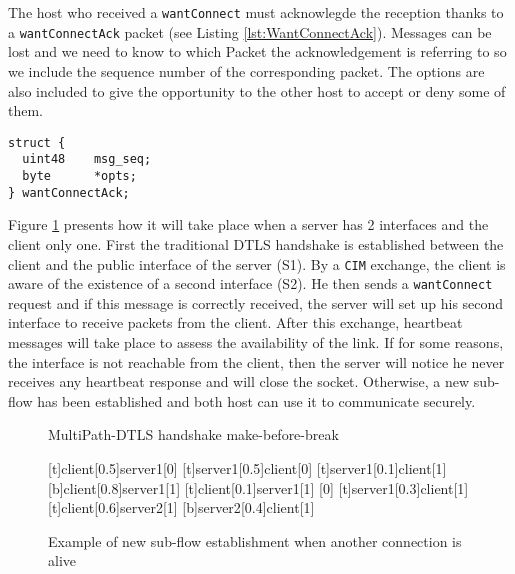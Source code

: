 The host who received a \verb!wantConnect! must acknowlegde the reception thanks to a \verb!wantConnectAck! packet (see Listing \ref{lst:WantConnectAck}). Messages can be lost and we need to know to which Packet the acknowledgement is referring to so we include the sequence number of the corresponding packet. The options are also included to give the opportunity to the other host to accept or deny some of them.

\begin{lstlisting}[caption= wantConnectAck message structure, label=lst:WantConnectAck]
struct {
  uint48    msg_seq;
  byte      *opts;
} wantConnectAck;
\end{lstlisting}

Figure \ref{fig:Handshake1} presents how it will take place when a server has 2 interfaces and the client only one. First the traditional DTLS handshake is established between the client and the public interface of the server (S1). By a \verb!CIM! exchange, the client is aware of the existence of a second interface (S2). He then sends a \verb!wantConnect! request and if this message is correctly received, the server will set up his second interface to receive packets from the client. After this exchange, heartbeat messages will take place to assess the availability of the link. If for some reasons, the interface is not reachable from the client, then the server will notice he never receives any heartbeat response and will close the socket. Otherwise, a new sub-flow has been established and both host can use it to communicate securely. 


\begin{figure}[!h]
\centering
\begin{msc}[r]{MultiPath-DTLS handshake make-before-break}

\setlength{\instfootheight}{0em}
\setlength{\instheadheight}{0em}
\setlength{\instdist}{0.33\linewidth}
\setlength{\levelheight}{3em}


[t]{client}[0.5]{server1}[0]
\nextlevel
{}[t]{server1}[0.5]{client}[0]
\nextlevel
{}[t]{server1}[0.1]{client}[1]
\nextlevel
{}[b]{client}[0.8]{server1}[1]
\nextlevel[2]
[t]{client}[0.1]{server1}[1]
\nextlevel
{}
[0]
[t]{server1}[0.3]{client}[1]
\nextlevel
{}
\nextlevel
{}[t]{client}[0.6]{server2}[1]
\nextlevel
{}[b]{server2}[0.4]{client}[1]
\nextlevel[2]

\end{msc}
\caption{Example of new sub-flow establishment when another connection is alive}
\label{fig:Handshake1}
\end{figure}

